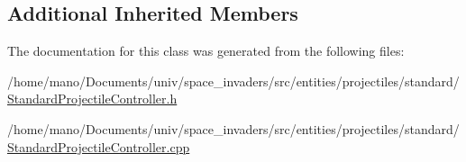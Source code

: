 \subsection*{Additional Inherited Members}


The documentation for this class was generated from the following files\+:\begin{DoxyCompactItemize}
\item 
/home/mano/\+Documents/univ/space\+\_\+invaders/src/entities/projectiles/standard/\hyperlink{StandardProjectileController_8h}{Standard\+Projectile\+Controller.\+h}\item 
/home/mano/\+Documents/univ/space\+\_\+invaders/src/entities/projectiles/standard/\hyperlink{StandardProjectileController_8cpp}{Standard\+Projectile\+Controller.\+cpp}\end{DoxyCompactItemize}
